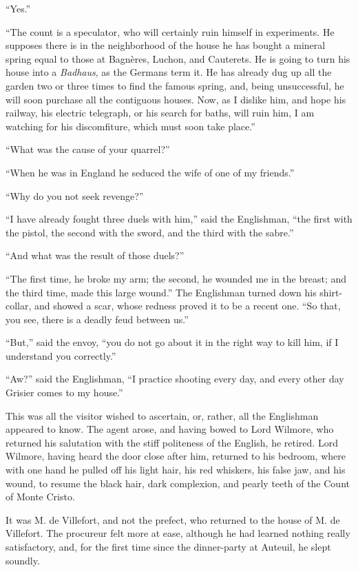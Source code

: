 “Yes.”

“The count is a speculator, who will certainly ruin himself in
experiments. He supposes there is in the neighborhood of the house he
has bought a mineral spring equal to those at Bagnères, Luchon, and
Cauterets. He is going to turn his house into a \textit{Badhaus}, as the
Germans term it. He has already dug up all the garden two or three
times to find the famous spring, and, being unsuccessful, he will soon
purchase all the contiguous houses. Now, as I dislike him, and hope his
railway, his electric telegraph, or his search for baths, will ruin
him, I am watching for his discomfiture, which must soon take place.”

“What was the cause of your quarrel?”

“When he was in England he seduced the wife of one of my friends.”

“Why do you not seek revenge?”

“I have already fought three duels with him,” said the Englishman, “the
first with the pistol, the second with the sword, and the third with
the sabre.”

“And what was the result of those duels?”

“The first time, he broke my arm; the second, he wounded me in the
breast; and the third time, made this large wound.” The Englishman
turned down his shirt-collar, and showed a scar, whose redness proved
it to be a recent one. “So that, you see, there is a deadly feud
between us.”

“But,” said the envoy, “you do not go about it in the right way to kill
him, if I understand you correctly.”

“Aw?” said the Englishman, “I practice shooting every day, and every
other day Grisier comes to my house.”

This was all the visitor wished to ascertain, or, rather, all the
Englishman appeared to know. The agent arose, and having bowed to Lord
Wilmore, who returned his salutation with the stiff politeness of the
English, he retired. Lord Wilmore, having heard the door close after
him, returned to his bedroom, where with one hand he pulled off his
light hair, his red whiskers, his false jaw, and his wound, to resume
the black hair, dark complexion, and pearly teeth of the Count of Monte
Cristo.

It was M. de Villefort, and not the prefect, who returned to the house
of M. de Villefort. The procureur felt more at ease, although he had
learned nothing really satisfactory, and, for the first time since the
dinner-party at Auteuil, he slept soundly.
